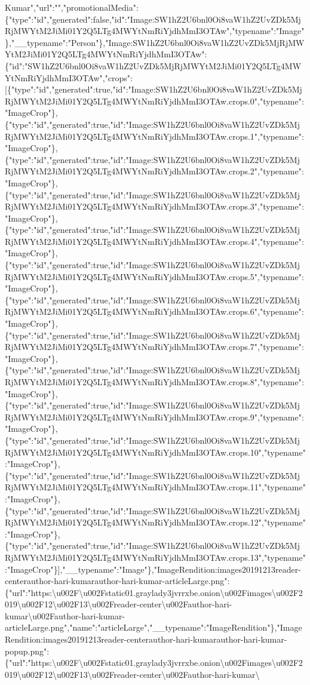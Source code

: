 Kumar","url":"","promotionalMedia":\{"type":"id","generated":false,"id":"Image:SW1hZ2U6bnl0Oi8vaW1hZ2UvZDk5MjRjMWYtM2JiMi01Y2Q5LTg4MWYtNmRiYjdhMmI3OTAw","typename":"Image"\},"\_\_typename":"Person"\},"Image:SW1hZ2U6bnl0Oi8vaW1hZ2UvZDk5MjRjMWYtM2JiMi01Y2Q5LTg4MWYtNmRiYjdhMmI3OTAw":\{"id":"SW1hZ2U6bnl0Oi8vaW1hZ2UvZDk5MjRjMWYtM2JiMi01Y2Q5LTg4MWYtNmRiYjdhMmI3OTAw","crops":{[}\{"type":"id","generated":true,"id":"Image:SW1hZ2U6bnl0Oi8vaW1hZ2UvZDk5MjRjMWYtM2JiMi01Y2Q5LTg4MWYtNmRiYjdhMmI3OTAw.crops.0","typename":"ImageCrop"\},\{"type":"id","generated":true,"id":"Image:SW1hZ2U6bnl0Oi8vaW1hZ2UvZDk5MjRjMWYtM2JiMi01Y2Q5LTg4MWYtNmRiYjdhMmI3OTAw.crops.1","typename":"ImageCrop"\},\{"type":"id","generated":true,"id":"Image:SW1hZ2U6bnl0Oi8vaW1hZ2UvZDk5MjRjMWYtM2JiMi01Y2Q5LTg4MWYtNmRiYjdhMmI3OTAw.crops.2","typename":"ImageCrop"\},\{"type":"id","generated":true,"id":"Image:SW1hZ2U6bnl0Oi8vaW1hZ2UvZDk5MjRjMWYtM2JiMi01Y2Q5LTg4MWYtNmRiYjdhMmI3OTAw.crops.3","typename":"ImageCrop"\},\{"type":"id","generated":true,"id":"Image:SW1hZ2U6bnl0Oi8vaW1hZ2UvZDk5MjRjMWYtM2JiMi01Y2Q5LTg4MWYtNmRiYjdhMmI3OTAw.crops.4","typename":"ImageCrop"\},\{"type":"id","generated":true,"id":"Image:SW1hZ2U6bnl0Oi8vaW1hZ2UvZDk5MjRjMWYtM2JiMi01Y2Q5LTg4MWYtNmRiYjdhMmI3OTAw.crops.5","typename":"ImageCrop"\},\{"type":"id","generated":true,"id":"Image:SW1hZ2U6bnl0Oi8vaW1hZ2UvZDk5MjRjMWYtM2JiMi01Y2Q5LTg4MWYtNmRiYjdhMmI3OTAw.crops.6","typename":"ImageCrop"\},\{"type":"id","generated":true,"id":"Image:SW1hZ2U6bnl0Oi8vaW1hZ2UvZDk5MjRjMWYtM2JiMi01Y2Q5LTg4MWYtNmRiYjdhMmI3OTAw.crops.7","typename":"ImageCrop"\},\{"type":"id","generated":true,"id":"Image:SW1hZ2U6bnl0Oi8vaW1hZ2UvZDk5MjRjMWYtM2JiMi01Y2Q5LTg4MWYtNmRiYjdhMmI3OTAw.crops.8","typename":"ImageCrop"\},\{"type":"id","generated":true,"id":"Image:SW1hZ2U6bnl0Oi8vaW1hZ2UvZDk5MjRjMWYtM2JiMi01Y2Q5LTg4MWYtNmRiYjdhMmI3OTAw.crops.9","typename":"ImageCrop"\},\{"type":"id","generated":true,"id":"Image:SW1hZ2U6bnl0Oi8vaW1hZ2UvZDk5MjRjMWYtM2JiMi01Y2Q5LTg4MWYtNmRiYjdhMmI3OTAw.crops.10","typename":"ImageCrop"\},\{"type":"id","generated":true,"id":"Image:SW1hZ2U6bnl0Oi8vaW1hZ2UvZDk5MjRjMWYtM2JiMi01Y2Q5LTg4MWYtNmRiYjdhMmI3OTAw.crops.11","typename":"ImageCrop"\},\{"type":"id","generated":true,"id":"Image:SW1hZ2U6bnl0Oi8vaW1hZ2UvZDk5MjRjMWYtM2JiMi01Y2Q5LTg4MWYtNmRiYjdhMmI3OTAw.crops.12","typename":"ImageCrop"\},\{"type":"id","generated":true,"id":"Image:SW1hZ2U6bnl0Oi8vaW1hZ2UvZDk5MjRjMWYtM2JiMi01Y2Q5LTg4MWYtNmRiYjdhMmI3OTAw.crops.13","typename":"ImageCrop"\}{]},"\_\_typename":"Image"\},"ImageRendition:images20191213reader-centerauthor-hari-kumarauthor-hari-kumar-articleLarge.png":\{"url":"https:\textbackslash{}u002F\textbackslash{}u002Fstatic01.graylady3jvrrxbe.onion\textbackslash{}u002Fimages\textbackslash{}u002F2019\textbackslash{}u002F12\textbackslash{}u002F13\textbackslash{}u002Freader-center\textbackslash{}u002Fauthor-hari-kumar\textbackslash{}u002Fauthor-hari-kumar-articleLarge.png","name":"articleLarge","\_\_typename":"ImageRendition"\},"ImageRendition:images20191213reader-centerauthor-hari-kumarauthor-hari-kumar-popup.png":\{"url":"https:\textbackslash{}u002F\textbackslash{}u002Fstatic01.graylady3jvrrxbe.onion\textbackslash{}u002Fimages\textbackslash{}u002F2019\textbackslash{}u002F12\textbackslash{}u002F13\textbackslash{}u002Freader-center\textbackslash{}u002Fauthor-hari-kumar\textbackslash{}
